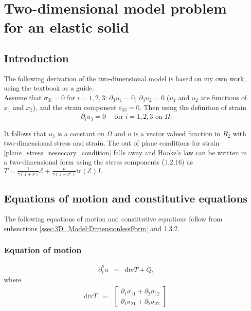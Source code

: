 \documentclass[../../main.tex]{subfiles}
\begin{document}
\section{Two-dimensional model problem for an elastic solid} \label{sec:2D_Model}
\subsection{Introduction}
The following derivation of the two-dimensional model is based on my own work, using the textbook \cite{Sadd05} as a guide.\\

Assume that $\sigma_{3i} = 0$ for $i = 1, 2, 3$\textcolor{red}{;} $\partial_3 u_1 = 0$, $\partial_3 u_2 = 0$ ($u_1$ and $u_2$ are functions of $x_1$ and $x_2$), and the strain component $\varepsilon_{33} = 0$. Then using the definition of strain 
\begin{eqnarray}
	\partial_i u_3 = 0 \quad \textrm{ for } i = 1,2,3 \textrm{ on } \Omega.
\end{eqnarray}

It follows that $u_3$ is a constant on $\Omega$ and $u$ is a vector valued function in $R_2$ with two-dimensional stress and strain. The out of plane conditions for strain \eqref{plane_stress_neseccary_condition} falls away and Hooke’s law can be written in a two-dimensional form using the stress components (1.2.16) as $\displaystyle T = \frac{1}{\gamma(1+\nu)}\mathcal{E} + \frac{\nu}{\gamma(1-\nu^2)}\textrm{tr}(\mathcal{E})I.$\\


\subsection{Equations of motion and constitutive equations}\label{ssec:2D_Model:EquationsOfMotion+ConstitutiveEquations}
 The following equations of motion and constitutive equations follow from subsections \ref{ssec:3D_Model:DimensionlessForm} and 1.3.2.
\subsubsection{Equation of motion}\label{sssec:2D_Model:EquationOfMotion}
\begin{eqnarray}
	\partial_t^2 u & = & \textrm{div}T + Q, \label{eq:2D_Model:EM}
\end{eqnarray}
where
\begin{eqnarray}
	\textrm{div} T & = &
	\begin{bmatrix}
		\partial_1 \sigma_{11} + \partial_2 \sigma_{12} \\
		\partial_1 \sigma_{21} + \partial_2 \sigma_{22}
	\end{bmatrix}. \label{eq:2D_Model:DivT}
\end{eqnarray}
\end{document}
